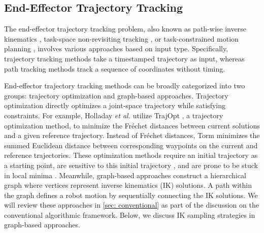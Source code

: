 
\subsection{End-Effector Trajectory Tracking}
\vspace{-1mm}

The end-effector trajectory tracking problem, also known as path-wise inverse kinematics \cite{rakita2019stampede}, task-space non-revisiting tracking \cite{yang2022optimal}, or task-constrained motion planning \cite{cefalo2013task}, involves various approaches based on input type. 
Specifically, trajectory tracking methods \cite{rakita2019stampede, holladay2019minimizing, wang2024iklink, yang2022optimal, Descartes} take a timestamped trajectory as input, whereas path tracking methods \cite{morgan2024cppflow, niyaz2020following} track a sequence of coordinates without timing.


End-effector trajectory tracking methods can be broadly categorized into two groups: trajectory optimization and graph-based approaches. Trajectory optimization directly optimizes a joint-space trajectory while satisfying constraints. For example, Holladay \textit{et al.} \cite{holladay2016distance} utilize TrajOpt \cite{schulman2014motion}, a trajectory optimization method, to minimize the Fréchet distances between current solutions and a given reference trajectory. Instead of Fréchet distances, Torm \cite{kang2020torm} minimizes the summed Euclidean distance between corresponding waypoints on the current and reference trajectories. 
These optimization methods require an initial trajectory as a starting point, are sensitive to this initial trajectory \cite{yoon2023learning}, and are prone to be stuck in local minima \cite{holladay2016distance}.  
Meanwhile, graph-based approaches \cite{rakita2019stampede, morgan2024cppflow, wang2024iklink, Descartes,niyaz2020following} construct a hierarchical graph where vertices represent inverse kinematics (IK) solutions. A path within the graph defines a robot motion by sequentially connecting the IK solutions. We will review these approaches in \cref{sec: conventional} as part of the discussion on the conventional algorithmic framework. Below, we discuss IK sampling strategies in graph-based approaches. 


\vspace{-3mm}
